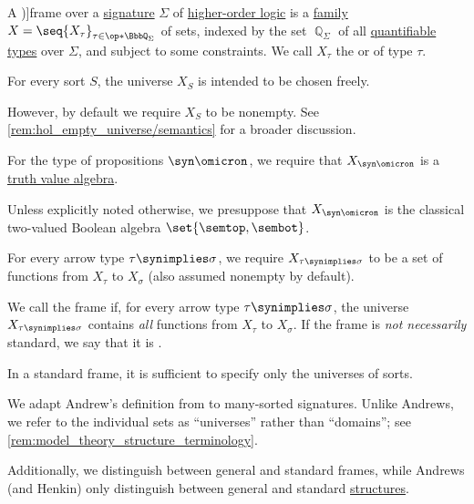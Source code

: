 \begin{definition}\label{def:hol_frame}\mimprovised
  A \term[en=frame (\cite[238]{Andrews2002Logic})]{frame} over a \hyperref[def:hol_signature]{signature} \( \Sigma \) of \hyperref[def:higher_order_logic]{higher-order logic} is a \hyperref[def:indexed_family]{family} \( X = \seq{ X_\tau }_{\tau \in \op*{\BbbQ_\Sigma}} \) of sets, indexed by the set \( \BbbQ_\Sigma \) of all \hyperref[def:quantifiable_type]{quantifiable types} over \( \Sigma \), and subject to some constraints. We call \( X_\tau \) the  or  of type \( \tau \).

  \begin{thmenum}
     For every sort \( S \), the universe \( X_S \) is intended to be chosen freely.

    However, by default we require \( X_S \) to be nonempty. See \cref{rem:hol_empty_universe/semantics} for a broader discussion.

     For the type of propositions \( \syn\omicron \), we require that \( X_{\syn\omicron} \) is a \hyperref[def:truth_value_algebra]{truth value algebra}.

    Unless explicitly noted otherwise, we presuppose that \( X_{\syn\omicron} \) is the classical two-valued Boolean algebra \( \set{ \semtop, \sembot } \).

     For every arrow type \( \tau \synimplies \sigma \), we require \( X_{\tau \synimplies \sigma} \) to be a set of functions from \( X_\tau \) to \( X_\sigma \) (also assumed nonempty by default).

    We call the frame  if, for every arrow type \( \tau \synimplies \sigma \), the universe \( X_{\tau \synimplies \sigma} \) contains \emph{all} functions from \( X_\tau \) to \( X_\sigma \). If the frame is \emph{not necessarily} standard, we say that it is .
  \end{thmenum}
\end{definition}
\begin{comments}
  \item In a standard frame, it is sufficient to specify only the universes of sorts.

  \item We adapt Andrew's definition from \cite[238]{Andrews2002Logic} to many-sorted signatures. Unlike Andrews, we refer to the individual sets as \enquote{universes} rather than \enquote{domains}; see \cref{rem:model_theory_structure_terminology}.

  Additionally, we distinguish between general and standard frames, while Andrews (and Henkin) only distinguish between general and standard \hyperref[def:hol_structure]{structures}.
\end{comments}


